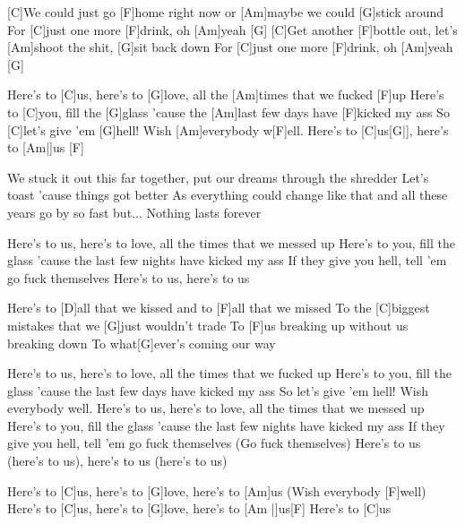 


\begin{guitar}
	[C]We could just go [F]home right now or [Am]maybe we could [G]stick around
	For [C]just one more [F]drink, oh [Am]yeah [G]{}
	[C]Get another [F]bottle out, let's [Am]shoot the shit, [G]sit back down
	For [C]just one more [F]drink, oh [Am]yeah [G]{}
	
	Here's to [C]us, here's to [G]love, all the [Am]times that we fucked [F]up
	Here's to [C]you, fill the [G]glass 'cause the [Am]last few days have [F]kicked my ass
	So [C]let's give 'em [G]hell! Wish [Am]everybody w[F]ell.
	Here's to [C]us[G|], here's to [Am|]{us} [F]{}
	
	We stuck it out this far together, put our dreams through the shredder
	Let's toast 'cause things got better
	As everything could change like that and all these years go by so fast but...
	Nothing lasts forever
	
	Here's to us, here's to love, all the times that we messed up
	Here's to you, fill the glass 'cause the last few nights have kicked my ass
	If they give you hell, tell 'em go fuck themselves
	Here's to us, here's to us
	
	Here's to [D]all that we kissed and to [F]all that we missed
	To the [C]biggest mistakes that we [G]just wouldn't trade
	To [F]us breaking up without us breaking down
	To what[G]ever's coming our way
	
	Here's to us, here's to love, all the times that we fucked up
	Here's to you, fill the glass 'cause the last few days have kicked my ass
	So let's give 'em hell! Wish everybody well.
	Here's to us, here's to love, all the times that we messed up
	Here's to you, fill the glass 'cause the last few nights have kicked my ass
	If they give you hell, tell 'em go fuck themselves (Go fuck themselves)
	Here's to us (here's to us), here's to us (here's to us)
	
	Here's to [C]us, here's to [G]love, here's to [Am]us (Wish everybody [F]well)
	Here's to [C]us, here's to [G]love, here's to [Am |]{us}[F]{}
	Here's to [C]us
\end{guitar}
